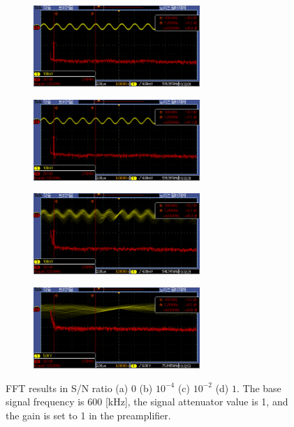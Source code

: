 \documentclass{article}
\begin{document}
 \begin{figure}[H]
  \begin{subfigure}[b]{6.3cm}
      \centering
      \includegraphics[width=6.3cm]{../raw_data/TEK00528.PNG}
      \caption{}
  \end{subfigure}
  \hfill
  \begin{subfigure}[b]{6.3cm}
    \centering
    \includegraphics[width=6.3cm]{../raw_data/TEK00530.PNG}
    \caption{}
\end{subfigure}
\hfill
\begin{subfigure}[b]{6.3cm}
  \centering
  \includegraphics[width=6.3cm]{../raw_data/TEK00532.PNG}
  \caption{}
\end{subfigure}
\hfill
\begin{subfigure}[b]{6.3cm}
  \centering
  \includegraphics[width=6.3cm]{../raw_data/TEK00534.PNG}
  \caption{}
\end{subfigure}
\hfill
  \caption{FFT results in S/N ratio (a) 0 (b) $10^{-4}$ (c) $10^{-2}$ (d) $1$.
    The base signal frequency is 600 [kHz], the signal attenuator value is 1, and the gain is set to 1 in the preamplifier.
   }
  \label{fig: noise_fft}
\end{figure}
\end{document}

